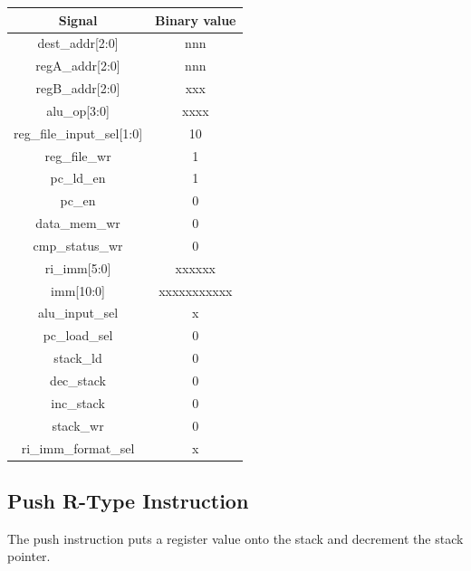 \documentclass{article}
\begin{document}
\begin{par}
	\begin{center}
		\begin{tabular}{|c|c|}
			\hline 
			\textbf{Signal} & \textbf{Binary value} \\ 
			\hline 
			dest\_addr[2:0] & nnn \\ 
			\hline 
			regA\_addr[2:0] & nnn \\ 
			\hline 
			regB\_addr[2:0] & xxx \\ 
			\hline 
			alu\_op[3:0] & xxxx \\ 
			\hline 
			reg\_file\_input\_sel[1:0] & 10 \\ 
			\hline 
			reg\_file\_wr & 1 \\ 
			\hline 
			pc\_ld\_en & 1 \\ 
			\hline 
			pc\_en & 0 \\ 
			\hline 
			data\_mem\_wr & 0 \\ 
			\hline 
			cmp\_status\_wr & 0 \\ 
			\hline 
			ri\_imm[5:0] & xxxxxx \\ 
			\hline 
			imm[10:0] & xxxxxxxxxxx \\ 
			\hline 
			alu\_input\_sel & x \\ 
			\hline 
			pc\_load\_sel & 0 \\ 
			\hline 
			stack\_ld & 0 \\ 
			\hline 
			dec\_stack & 0 \\ 
			\hline 
			inc\_stack & 0 \\ 
			\hline 
			stack\_wr & 0 \\ 
			\hline 
			ri\_imm\_format\_sel & x \\ 
			\hline 
		\end{tabular} 
	\end{center}

	\newpage
	\subsection{Push R-Type Instruction}
	
	The push instruction puts a register value onto the stack and decrement the stack pointer. 
	

\end{par}
\end{document}
